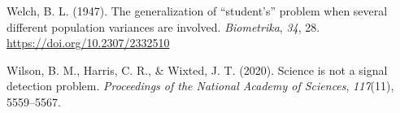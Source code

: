 \documentclass[
  man]{apa7}
\newlength{\cslhangindent}
\newlength{\cslentryspacingunit} %
\newenvironment{CSLReferences}[2] %
 {%
  \setlength{\parindent}{0pt}
  \ifodd #1
  \let\oldpar\par
  \def\par{\hangindent=\cslhangindent\oldpar}
  \fi
  \setlength{\parskip}{#2\cslentryspacingunit}
 }%
 {}
\begin{document}
\begin{CSLReferences}{1}{0}
\leavevmode{}%
Welch, B. L. (1947). The generalization of {``student's''} problem when several different population variances are involved. \emph{Biometrika}, \emph{34}, 28. \url{https://doi.org/10.2307/2332510}

\leavevmode{}%
Wilson, B. M., Harris, C. R., \& Wixted, J. T. (2020). Science is not a signal detection problem. \emph{Proceedings of the National Academy of Sciences}, \emph{117}(11), 5559--5567.

\end{CSLReferences}
\end{document}
